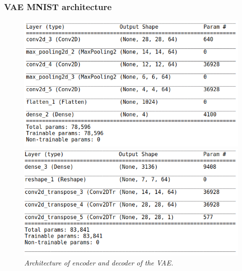 \documentclass{beamer}
\begin{document}
\begin{frame}
\frametitle{VAE MNIST architecture}
\begin{figure}
	\begin{minipage}{0.45\linewidth}
		\includegraphics[scale=0.26]{mnist_vae_encoder.png}
	\end{minipage}
	\begin{minipage}{0.45\linewidth}
		\includegraphics[scale=0.26]{mnist_vae_decoder.png}
	\end{minipage}
	\caption{\it Architecture of encoder and decoder of the VAE.}
\end{figure}
\end{frame}
\end{document}
